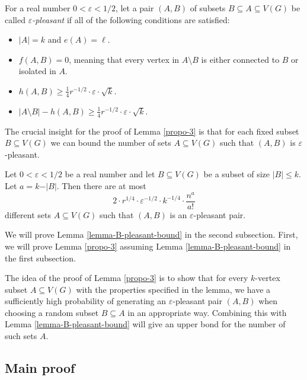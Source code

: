 \begin{definition}\label{defi-pleasant}For a real number $0<\varepsilon<1/2$, let a pair $(A,B)$ of subsets $B\subseteq A\subseteq V(G)$ be called \emph{$\varepsilon$-pleasant} if all of the following conditions are satisfied:
\begin{itemize}
\item[(i)] $\vert A\vert=k$ and $e(A)=\ell$.
\item[(ii)] $f(A,B)=0$, meaning that every vertex in $A\setminus B$ is either connected to $B$ or isolated in $A$.
\item[(iii)] $h(A,B)\geq \frac{1}{4}r^{-1/2}\cdot \varepsilon\cdot \sqrt{k}$.
\item[(iv)] $\vert A\setminus B\vert-h(A,B)\geq \frac{1}{4}r^{-1/2}\cdot \varepsilon\cdot \sqrt{k}$.
\end{itemize}
\end{definition}

The crucial insight for the proof of Lemma \ref{propo-3} is that for each fixed subset $B\subseteq V(G)$ we can bound the number of sets $A\subseteq V(G)$ such that $(A,B)$ is $\varepsilon$-pleasant.

\begin{lemma}\label{lemma-B-pleasant-bound}Let $0<\varepsilon<1/2$ be a real number and let $B\subseteq V(G)$ be a subset of size $\vert B\vert\leq k$. Let $a=k-\vert B\vert$. Then there are at most 
\[2\cdot r^{1/4}\cdot \varepsilon^{-1/2}\cdot k^{-1/4}\cdot \frac{n^a}{a!}\]
different sets $A\subseteq V(G)$ such that $(A,B)$ is an $\varepsilon$-pleasant pair.
\end{lemma}

We will prove Lemma \ref{lemma-B-pleasant-bound} in the second subsection. First, we will prove Lemma \ref{propo-3} assuming Lemma \ref{lemma-B-pleasant-bound} in the first subsection.

The idea of the proof of Lemma \ref{propo-3} is to show that for every $k$-vertex subset $A\subseteq V(G)$ with the properties specified in the lemma, we have a sufficiently high probability of generating an $\varepsilon$-pleasant pair $(A,B)$ when choosing a random subset $B\subseteq A$ in an appropriate way. Combining this with Lemma \ref{lemma-B-pleasant-bound} will give an upper bond for the number of such sets $A$.

\subsection{Main proof}

